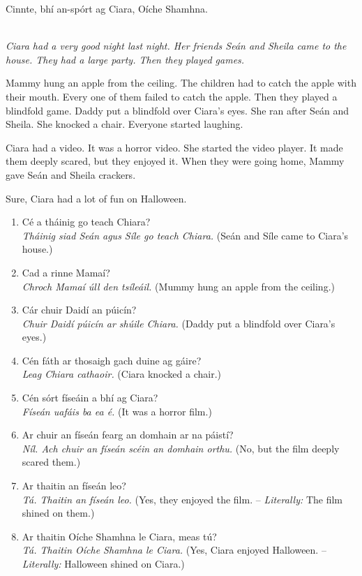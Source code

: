 \documentclass[article,a4paper,oneside,12pt]{memoir}
\begin{document}
Cinnte, bhí an-spórt ag Ciara, Oíche Shamhna.\\\\

{\itshape
  Ciara had a very good night last night. Her friends Seán and Sheila came to the house. They had a large party. Then they played games.

  Mammy hung an apple from the ceiling. The children had to catch the apple with their mouth. Every one of them failed to catch the apple. Then they played a blindfold game. Daddy put a blindfold over Ciara's eyes. She ran after Seán and Sheila. She knocked a chair. Everyone started laughing.

  Ciara had a video. It was a horror video. She started the video player. It made them deeply scared, but they enjoyed it. When they were going home, Mammy gave Seán and Sheila crackers.

  Sure, Ciara had a lot of fun on Halloween.
}

\begin{enumerate}
  \item C\'{e} a tháinig go teach Chiara?\\
    	\emph{Tháinig siad Seán agus Síle go teach Chiara.}
	{\tiny (Seán and Síle came to Ciara's house.)}
  \item Cad a rinne Mamaí?\\
    	\emph{Chroch Mamaí úll den tsíleáil.}
	{\tiny (Mummy hung an apple from the ceiling.)}
  \item Cár chuir Daidí an púicín?\\
    	\emph{Chuir Daidí púicín ar shúile Chiara.}
	{\tiny (Daddy put a blindfold over Ciara's eyes.)}
  \item C\'{e}n fáth ar thosaigh gach duine ag gáire?\\
    	\emph{Leag Chiara cathaoir.}
	{\tiny (Ciara knocked a chair.)}
  \item C\'{e}n sórt físeáin a bhí ag Ciara?\\
    	\emph{Físeán uafáis ba ea \'{e}.}
	{\tiny (It was a horror film.)}
  \item Ar chuir an físeán fearg an domhain ar na páistí?\\
    	\emph{Níl. Ach chuir an físeán sc\'{e}in an domhain orthu.}
	{\tiny (No, but the film deeply scared them.)}
  \item Ar thaitin an físeán leo?\\
    	\emph{Tá. Thaitin an físeán leo.}    	
	{\tiny (Yes, they enjoyed the film. --
	  \emph{Literally:} The film shined on them.)}
  \item Ar thaitin Oíche Shamhna le Ciara, meas tú?\\
    	\emph{Tá. Thaitin Oíche Shamhna le Ciara.}
	{\tiny (Yes, Ciara enjoyed Halloween. --
	  \emph{Literally:} Halloween shined on Ciara.)}
\end{enumerate}
\end{document}
